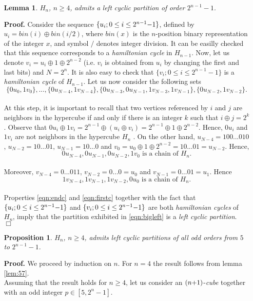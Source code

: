 \documentclass{article}
\newtheorem{lemma}{Lemma}
\newtheorem{proposition}{Proposition}
\begin{document}
\begin{lemma}  \label{lem:ipmax}
$H_n$, $n\geq 4$, admits a {\em left 
cyclic} partition of order $2^{n-1}-1$.
\end{lemma}
{\bf Proof.} Consider the sequence $\{ u_i;0\leq i\leq 2^{n-1}{\rm -}1\}$,
defined by $u_i=bin(i)\oplus bin(i/2)$, where $bin(x)$ is the
$n$-position binary representation of the integer $x$, and symbol $/$ denotes integer
division. It can be easilly checked that this sequence corresponds to a {\em
  hamiltonian cycle} in $H_{n-1}$. Now, let us denote $v_i=u_i\oplus 1\oplus
2^{n-2}$ (i.e. $v_i$ is obtained from $u_i$ by changing the first and last
bits) and $N=2^n$. It is also easy to check that $\{ v_i;0\leq i\leq
2^{n-1}-1\}$ is a {\em hamiltonian cycle} of $H_{n-1}$. Let us now consider the following
sets\\
\begin{equation}    \label{eqn:bigleft}
\{0u_0,1v_0\},...,
\{0u_{N-4},1v_{N-4}\},\{0u_{N-3},0u_{N-1},1v_{N-3},1v_{N-1}\},
\{0u_{N-2},1v_{N-2}\}. 
\end{equation}\\
At this step, it is important to recall that two vertices referenced by $i$
and $j$ are neighbors in the hypercube if and only if there is an integer $k$
such that $i\oplus j=2^k$. Observe that $0u_i\oplus 1v_i=2^{n-1}\oplus
(u_i\oplus v_i)=2^{n-1}\oplus 1\oplus 2^{n-2}$. Hence, $0u_i$ and $1v_i$ are
not neighbors in the hypercube $H_{n}$ . On the other hand, $u_{N-4}=100...010$,
 $u_{N-2}=10...01$, $u_{N-1}=10...0$ and $v_0=u_0\oplus 1\oplus
 2^{n-2}=10...01=u_{N-2}$. Hence, \\
\begin{equation}   \label{eqn:endc}
0u_{N-4}, 0u_{N-1},  0u_{N-2}, 1v_0
 \mbox{ is a chain of } H_n.
\end{equation}\\
Moreover, $v_{N-4}=0...011$, $v_{N-2}=0...0=u_0$ and
$v_{N-1}=0...01=u_1$. Hence 
\begin{equation}   \label{eqn:firstc}
1v_{N-4}, 1v_{N-1},  1v_{N-2}, 0u_0
 \mbox{ is a chain of } H_n.
\end{equation}\\
Properties \ref{eqn:endc} and \ref{eqn:firstc} together with the fact that
$\{ u_i;0\leq i\leq 2^{n-1}{\rm -}1\}$ and $\{ v_i;0\leq i\leq 2^{n-1}{\rm
  -}1\}$ are both {\em hamiltonian cycles} of $H_n$, imply that the
partition exhibited in \ref{eqn:bigleft} is a {\em left cyclic partition}. \\    
$\Box$ \\
\begin{proposition}   \label{prop:ip}
$H_n$, $n\geq 4$, admits left cyclic partitions of all odd orders 
from $5$ to $2^{n-1}-1$. 
\end{proposition}
{\bf Proof.} We proceed by induction on $n$.
For $n=4$ the result follows from lemma \ref{lem:57}.\\
Assuming that the result holds for $n\geq 4$, let us consider an $(n{\rm
  +}1)$-{\em cube} together with an odd integer $p\in [5,2^n-1]$.
\end{document}
